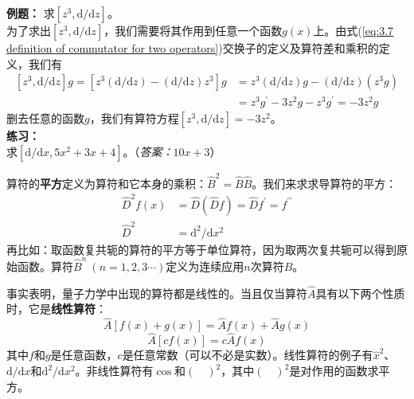 	\begin{examplebox}
		\textbf{例题：}
		求$\left[z^3,\mathrm{d}/\mathrm{d}z\right]$。\\
		
		为了求出$\left[z^3,\mathrm{d}/\mathrm{d}z\right]$，我们需要将其作用到任意一个函数$g\left(x\right)$上。由式(\ref{eq:3.7 definition of commutator for two operators})交换子的定义及算符差和乘积的定义，我们有
		\begin{equation*}
			\begin{aligned}
				\left[z^3,\mathrm{d}/\mathrm{d}z\right]g = \left[z^3\left(\mathrm{d}/\mathrm{d}z\right) - \left(\mathrm{d}/\mathrm{d}z\right)z^3\right]g & = z^3\left(\mathrm{d}/\mathrm{d}z\right)g - \left(\mathrm{d}/\mathrm{d}z\right)\left(z^3g\right) \\
				& = z^3g^{\prime} - 3z^2g-z^3g^{\prime} = -3z^2g
			\end{aligned}
		\end{equation*}
		删去任意的函数$g$，我们有算符方程$\left[z^3,\mathrm{d}/\mathrm{d}z\right] = -3z^2$。\\
		
		\textbf{练习：}\\
		求$\left[\mathrm{d}/\mathrm{d}x, 5x^2+3x+4\right]$。（\textit{答案：}$10x+3$）
	\end{examplebox}

	算符的\textbf{平方}定义为算符和它本身的乘积：$\hat{B}^2 = \hat{B}\hat{B}$。我们来求求导算符的平方：
	\begin{equation*}
		\begin{aligned}
			\hat{D}^2f\left(x\right) & = \hat{D}\left(\hat{D}f\right) = \hat{D}f^{\prime} = f^{\prime \prime} \\
			\hat{D}^2& = \mathrm{d}^2/\mathrm{d}x^2
		\end{aligned}
	\end{equation*}
	再比如：取函数复共轭的算符的平方等于单位算符，因为取两次复共轭可以得到原始函数。算符$\hat{B}^n \: \left(n = 1,2,3\cdots\right)$定义为连续应用$n$次算符$\hat{B}$。

	事实表明，量子力学中出现的算符都是线性的。当且仅当算符$\hat{A}$具有以下两个性质时，它是\textbf{线性算符}：
	\begin{equation}
		\boxed{
			\hat{A}\left[f\left(x\right)+g\left(x\right)\right] = \hat{A}f\left(x\right)+\hat{A}g\left(x\right)
		}
		\label{eq:3.9}
	\end{equation}
	\begin{equation}
		\boxed{
			\hat{A}\left[cf\left(x\right)\right] = c\hat{A}f\left(x\right)
		}
		\label{eq:3.10}
	\end{equation}
	其中$f$和$g$是任意函数，$c$是任意常数（可以不必是实数）。线性算符的例子有$\hat{x}^2$、$\mathrm{d}/\mathrm{d}x$和$\mathrm{d}^2/\mathrm{d}x^2$。非线性算符有$\cos$和$\left(\quad\right)^2$，其中$\left(\quad\right)^2$是对作用的函数求平方。

